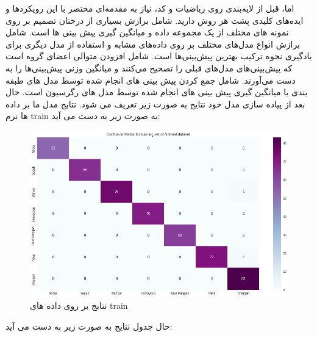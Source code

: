 \documentclass{article}
\begin{document}
اما، قبل از لایه‌بندی روی ریاضیات و کد، نیاز به مقدمه‌ای مختصر با این رویکردها و ایده‌های کلیدی پشت هر روش دارید.
 شامل برازش بسیاری از درختان تصمیم بر روی نمونه های مختلف از یک مجموعه داده و میانگین گیری پیش بینی ها است. \newline
{} شامل برازش انواع مدل‌های مختلف بر روی داده‌های مشابه و استفاده از مدل دیگری برای یادگیری نحوه ترکیب بهترین پیش‌بینی‌ها است. \newline
{} شامل افزودن متوالی اعضای گروه است که پیش‌بینی‌های مدل‌های قبلی را تصحیح می‌کنند و میانگین وزنی پیش‌بینی‌ها را به دست می‌آورند.
 شامل جمع کردن پیش بینی های انجام شده توسط مدل های طبقه بندی یا میانگین گیری پیش بینی های انجام شده توسط مدل های رگرسیون است.
حال بعد از پیاده سازی مدل خود نتایج به صورت زیر تعریف می شود. \newline
نتایج مدل ما بر داده ها نرم train به صورت زیر به دست می آید:\newline
\begin{figure}[h]
	\centering
	\includegraphics[width=0.7\linewidth]{Photo/40}
	\caption[نتایج  بر روی داده های train]{نتایج  بر روی داده های train}
	\label{fig:40}
\end{figure}
حال جدول نتایج به صورت زیر به دست می آید:\newline
\end{document}
